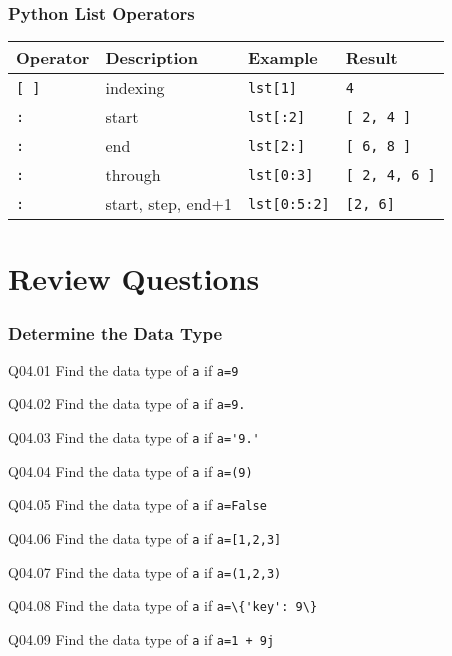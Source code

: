 \documentclass{book}
\newenvironment{problems}{}{}  %
\newcommand{\passthrough}[1]{#1}
\begin{document}
\hypertarget{python-list-operators}{%
\subsubsection{Python List Operators}\label{python-list-operators}}

\begin{longtable}[]{@{}llll@{}}
\toprule
Operator & Description & Example & Result\tabularnewline
\midrule
\endhead
\passthrough{\lstinline![ ]!} & indexing &
\passthrough{\lstinline!lst[1]!} &
\passthrough{\lstinline!4!}\tabularnewline
\passthrough{\lstinline!:!} & start & \passthrough{\lstinline!lst[:2]!}
& \passthrough{\lstinline![ 2, 4 ]!}\tabularnewline
\passthrough{\lstinline!:!} & end & \passthrough{\lstinline!lst[2:]!} &
\passthrough{\lstinline![ 6, 8 ]!}\tabularnewline
\passthrough{\lstinline!:!} & through &
\passthrough{\lstinline!lst[0:3]!} &
\passthrough{\lstinline![ 2, 4, 6 ]!}\tabularnewline
\passthrough{\lstinline!:!} & start, step, end+1 &
\passthrough{\lstinline!lst[0:5:2]!} &
\passthrough{\lstinline![2, 6]!}\tabularnewline
\bottomrule
\end{longtable}
    




    
        \hypertarget{review-questions}{%
\section{Review Questions}\label{review-questions}}
    




    
        \begin{problems}
        \hypertarget{determine-the-data-type}{%
\subsubsection{Determine the Data Type}\label{determine-the-data-type}}

Q04.01 Find the data type of \passthrough{\lstinline!a!} if
\passthrough{\lstinline!a=9!}

Q04.02 Find the data type of \passthrough{\lstinline!a!} if
\passthrough{\lstinline!a=9.!}

Q04.03 Find the data type of \passthrough{\lstinline!a!} if
\passthrough{\lstinline!a='9.'!}

Q04.04 Find the data type of \passthrough{\lstinline!a!} if
\passthrough{\lstinline!a=(9)!}

Q04.05 Find the data type of \passthrough{\lstinline!a!} if
\passthrough{\lstinline!a=False!}

Q04.06 Find the data type of \passthrough{\lstinline!a!} if
\passthrough{\lstinline!a=[1,2,3]!}

Q04.07 Find the data type of \passthrough{\lstinline!a!} if
\passthrough{\lstinline!a=(1,2,3)!}

Q04.08 Find the data type of \passthrough{\lstinline!a!} if
\passthrough{\lstinline!a=\{'key': 9\}!}

Q04.09 Find the data type of \passthrough{\lstinline!a!} if
\passthrough{\lstinline!a=1 + 9j!}
        \end{problems}
\end{document}
